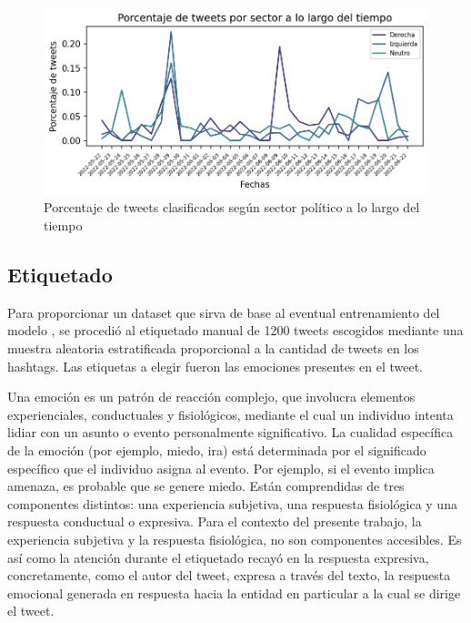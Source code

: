 \begin{figure}[t]
	\centering
	\includegraphics{Images & Logos/EDA/Porcentaje de tweets por sector a lo largo del tiempo.png} 
	\caption{Porcentaje de tweets clasificados según sector político a lo largo del tiempo}
	\label{figure:tweets_porcentaje_tiempo}
\end{figure}



\subsection{Etiquetado}

Para proporcionar un dataset que sirva de base al eventual entrenamiento del modelo , se procedió al etiquetado manual de 1200 tweets escogidos mediante una muestra aleatoria estratificada proporcional a la cantidad de tweets en los hashtags. Las etiquetas a elegir fueron las emociones presentes en el tweet. 

Una emoción es un patrón de reacción complejo, que involucra elementos experienciales, conductuales y fisiológicos, mediante el cual un individuo intenta lidiar con un asunto o evento personalmente significativo. La cualidad específica de la emoción (por ejemplo, miedo, ira) está determinada por el significado específico que el individuo asigna al evento. Por ejemplo, si el evento implica amenaza, es probable que se genere miedo. Están comprendidas de tres componentes distintos: una experiencia subjetiva, una respuesta fisiológica y una respuesta conductual o expresiva.
Para el contexto del presente trabajo, la experiencia subjetiva y la respuesta fisiológica, no son componentes accesibles. Es así como la atención durante el etiquetado recayó en la respuesta expresiva, concretamente, como el autor del tweet, expresa a través del texto, la respuesta emocional generada en respuesta hacia la entidad en particular a la cual se dirige el tweet. 

